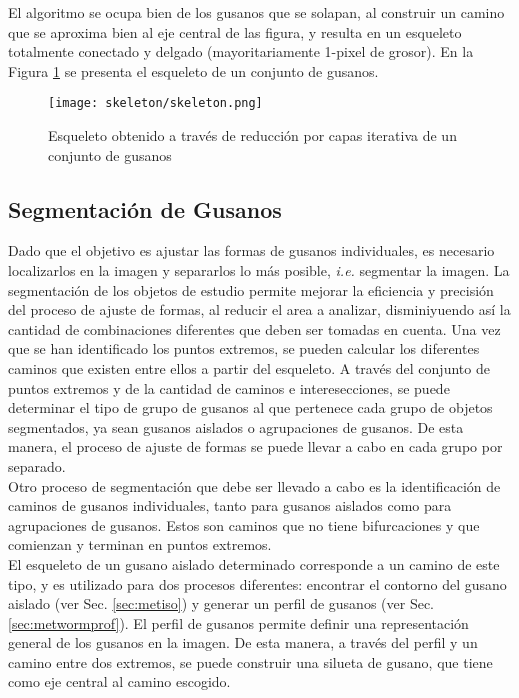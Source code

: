 El algoritmo se ocupa bien de los gusanos que se solapan, al construir un camino que 
se aproxima bien al eje central de las figura, y resulta en un esqueleto totalmente
conectado y delgado (mayoritariamente 1-pixel de grosor).
En la Figura \ref{fig:skeleton} se presenta el esqueleto de un conjunto de gusanos.

\begin{figure}[h t b p ! H]
 \centering
   \texttt{[image: skeleton/skeleton.png]}
 \caption{Esqueleto obtenido a trav\'es de reducci\'on por capas iterativa
   de un conjunto de gusanos}
\label{fig:skeleton}
\end{figure} 

\subsection{Segmentaci\'on de Gusanos}
\label{sec:metsegmentation}

Dado que el objetivo es ajustar las formas de gusanos individuales, es 
necesario localizarlos en la imagen y separarlos lo m\'as posible, 
\emph{i.e. }segmentar la imagen. La segmentaci\'on de los objetos 
de estudio permite mejorar la eficiencia y precisi\'on del proceso
de ajuste de formas, al reducir el area a analizar, disminiyuendo as\'i
la cantidad de combinaciones diferentes que deben ser tomadas en cuenta.
Una vez que se han identificado los puntos extremos, se pueden calcular
los diferentes caminos que existen entre ellos a partir del esqueleto.
A trav\'es del conjunto de puntos extremos y de la cantidad de caminos e 
interesecciones, se puede determinar el tipo de grupo de gusanos al que
pertenece cada grupo de objetos segmentados, ya sean gusanos aislados
o agrupaciones de gusanos. De esta manera, el proceso de ajuste de formas
se puede llevar a cabo en cada grupo por separado.\\

Otro proceso de segmentaci\'on que debe ser llevado a cabo es la identificaci\'on
de caminos de gusanos individuales, tanto para gusanos aislados como para agrupaciones
de gusanos. Estos son caminos que no tiene bifurcaciones y que comienzan y terminan
en puntos extremos.\\
El esqueleto de un gusano aislado determinado corresponde a un camino de este tipo, y es
utilizado para dos procesos diferentes: encontrar el contorno del gusano aislado 
(ver Sec. \ref{sec:metiso}) y generar un perfil de gusanos (ver Sec. \ref{sec:metwormprof}).
El perfil de gusanos permite definir una representaci\'on general de los gusanos en 
la imagen. De esta manera, a trav\'es del perfil y un camino entre dos extremos, se puede
construir una silueta de gusano, que tiene como eje central al camino escogido. \\

